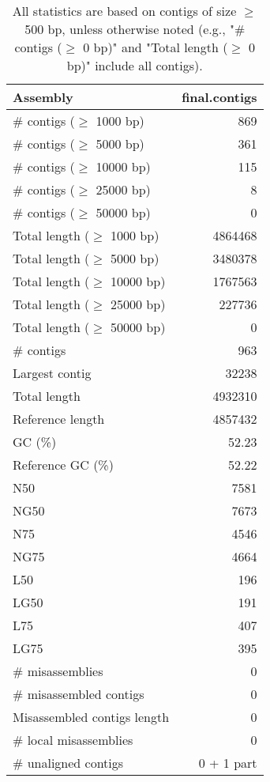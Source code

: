 \documentclass[12pt,a4paper]{article}
\begin{document}
\begin{table}[ht]
\begin{center}
\caption{All statistics are based on contigs of size $\geq$ 500 bp, unless otherwise noted (e.g., "\# contigs ($\geq$ 0 bp)" and "Total length ($\geq$ 0 bp)" include all contigs).}
\begin{tabular}{|l*{1}{|r}|}
\hline
Assembly & final.contigs \\ \hline
\# contigs ($\geq$ 1000 bp) & 869 \\ \hline
\# contigs ($\geq$ 5000 bp) & 361 \\ \hline
\# contigs ($\geq$ 10000 bp) & 115 \\ \hline
\# contigs ($\geq$ 25000 bp) & 8 \\ \hline
\# contigs ($\geq$ 50000 bp) & 0 \\ \hline
Total length ($\geq$ 1000 bp) & 4864468 \\ \hline
Total length ($\geq$ 5000 bp) & 3480378 \\ \hline
Total length ($\geq$ 10000 bp) & 1767563 \\ \hline
Total length ($\geq$ 25000 bp) & 227736 \\ \hline
Total length ($\geq$ 50000 bp) & 0 \\ \hline
\# contigs & 963 \\ \hline
Largest contig & 32238 \\ \hline
Total length & 4932310 \\ \hline
Reference length & 4857432 \\ \hline
GC (\%) & 52.23 \\ \hline
Reference GC (\%) & 52.22 \\ \hline
N50 & 7581 \\ \hline
NG50 & 7673 \\ \hline
N75 & 4546 \\ \hline
NG75 & 4664 \\ \hline
L50 & 196 \\ \hline
LG50 & 191 \\ \hline
L75 & 407 \\ \hline
LG75 & 395 \\ \hline
\# misassemblies & 0 \\ \hline
\# misassembled contigs & 0 \\ \hline
Misassembled contigs length & 0 \\ \hline
\# local misassemblies & 0 \\ \hline
\# unaligned contigs & 0 + 1 part \\ \hline

\end{tabular}
\end{center}
\end{table}
\end{document}
